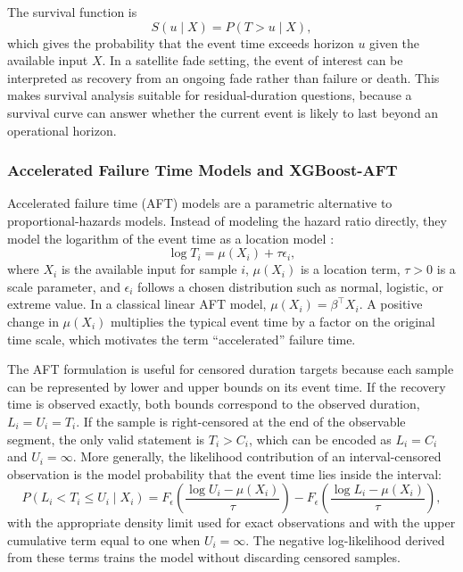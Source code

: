 The survival function is
\[
  S(u \mid X) = P(T > u \mid X),
\]
which gives the probability that the event time exceeds horizon \(u\)
given the available input \(X\). In a satellite fade setting, the event of interest can be
interpreted as recovery from an ongoing fade rather than failure or death. This
makes survival analysis suitable for residual-duration questions, because a
survival curve can answer whether the current event is likely to last beyond an
operational horizon.

\subsubsection{Accelerated Failure Time Models and XGBoost-AFT}

Accelerated failure time (AFT) models are a parametric alternative to
proportional-hazards models. Instead of modeling the hazard ratio directly,
they model the logarithm of the event time as a location model
\cite{keiding2015survival,barnwal2022xgboostAft}:
\[
  \log T_i = \mu(X_i) + \tau \epsilon_i ,
\]
where \(X_i\) is the available input for sample \(i\), \(\mu(X_i)\) is a
location term, \(\tau>0\) is a scale parameter, and \(\epsilon_i\) follows a
chosen distribution such as normal, logistic, or extreme value. In a classical
linear AFT model, \(\mu(X_i)=\beta^\top X_i\). A positive change in
\(\mu(X_i)\) multiplies the typical event time by a factor on the original
time scale, which motivates the term ``accelerated'' failure time.

The AFT formulation is useful for censored duration targets because each sample
can be represented by lower and upper bounds on its event time. If the recovery
time is observed exactly, both bounds correspond to the observed duration,
\(L_i=U_i=T_i\). If the sample is right-censored at the end of the observable
segment, the only valid statement is \(T_i>C_i\), which can be encoded as
\(L_i=C_i\) and \(U_i=\infty\). More generally, the likelihood contribution of
an interval-censored observation is the model probability that the event time
lies inside the interval:
\[
  P(L_i < T_i \le U_i \mid X_i)
  =
  F_{\epsilon}
  \left(
    \frac{\log U_i - \mu(X_i)}{\tau}
  \right)
  -
  F_{\epsilon}
  \left(
    \frac{\log L_i - \mu(X_i)}{\tau}
  \right),
\]
with the appropriate density limit used for exact observations and with the
upper cumulative term equal to one when \(U_i=\infty\). The negative
log-likelihood derived from these terms trains the model without discarding
censored samples.

